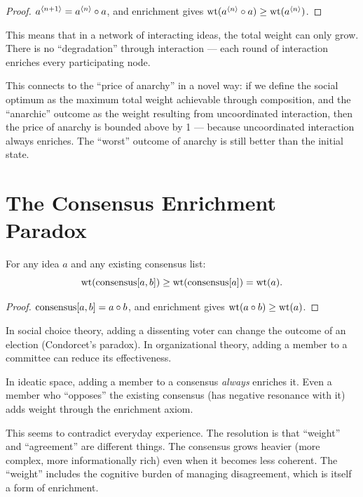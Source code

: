 \begin{proof}
$a^{\langle n+1 \rangle} = a^{\langle n \rangle} \circ a$, and enrichment gives $\operatorname{wt}(a^{\langle n \rangle} \circ a) \geq \operatorname{wt}(a^{\langle n \rangle})$.
\end{proof}

\begin{interpretation}
This means that in a network of interacting ideas, the total weight can only grow. There is no ``degradation'' through interaction --- each round of interaction enriches every participating node.

This connects to the ``price of anarchy'' in a novel way: if we define the social optimum as the maximum total weight achievable through composition, and the ``anarchic'' outcome as the weight resulting from uncoordinated interaction, then the price of anarchy is bounded above by 1 --- because uncoordinated interaction always enriches. The ``worst'' outcome of anarchy is still better than the initial state.
\end{interpretation}

\section{The Consensus Enrichment Paradox}

\begin{theorem}
For any idea $a$ and any existing consensus list:
\[
\operatorname{wt}(\text{consensus}[a, b]) \geq \operatorname{wt}(\text{consensus}[a]) = \operatorname{wt}(a).
\]
\end{theorem}

\begin{proof}
$\text{consensus}[a, b] = a \circ b$, and enrichment gives $\operatorname{wt}(a \circ b) \geq \operatorname{wt}(a)$.
\end{proof}

\begin{paradox}
In social choice theory, adding a dissenting voter can change the outcome of an election (Condorcet's paradox). In organizational theory, adding a member to a committee can reduce its effectiveness.

In ideatic space, adding a member to a consensus \emph{always} enriches it. Even a member who ``opposes'' the existing consensus (has negative resonance with it) adds weight through the enrichment axiom.

This seems to contradict everyday experience. The resolution is that ``weight'' and ``agreement'' are different things. The consensus grows heavier (more complex, more informationally rich) even when it becomes less coherent. The ``weight'' includes the cognitive burden of managing disagreement, which is itself a form of enrichment.
\end{paradox}


